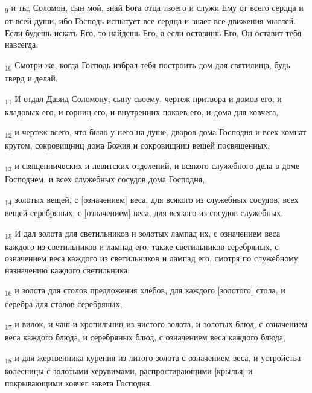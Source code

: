 \begin{tcolorbox}
\textsubscript{9} и ты, Соломон, сын мой, знай Бога отца твоего и служи Ему от всего сердца и от всей души, ибо Господь испытует все сердца и знает все движения мыслей. Если будешь искать Его, то найдешь Его, а если оставишь Его, Он оставит тебя навсегда.
\end{tcolorbox}
\begin{tcolorbox}
\textsubscript{10} Смотри же, когда Господь избрал тебя построить дом для святилища, будь тверд и делай.
\end{tcolorbox}
\begin{tcolorbox}
\textsubscript{11} И отдал Давид Соломону, сыну своему, чертеж притвора и домов его, и кладовых его, и горниц его, и внутренних покоев его, и дома для ковчега,
\end{tcolorbox}
\begin{tcolorbox}
\textsubscript{12} и чертеж всего, что было у него на душе, дворов дома Господня и всех комнат кругом, сокровищниц дома Божия и сокровищниц вещей посвященных,
\end{tcolorbox}
\begin{tcolorbox}
\textsubscript{13} и священнических и левитских отделений, и всякого служебного дела в доме Господнем, и всех служебных сосудов дома Господня,
\end{tcolorbox}
\begin{tcolorbox}
\textsubscript{14} золотых вещей, с [означением] веса, для всякого из служебных сосудов, всех вещей серебряных, с [означением] веса, для всякого из сосудов служебных.
\end{tcolorbox}
\begin{tcolorbox}
\textsubscript{15} И дал золота для светильников и золотых лампад их, с означением веса каждого из светильников и лампад его, также светильников серебряных, с означением веса каждого из светильников и лампад его, смотря по служебному назначению каждого светильника;
\end{tcolorbox}
\begin{tcolorbox}
\textsubscript{16} и золота для столов предложения хлебов, для каждого [золотого] стола, и серебра для столов серебряных,
\end{tcolorbox}
\begin{tcolorbox}
\textsubscript{17} и вилок, и чаш и кропильниц из чистого золота, и золотых блюд, с означением веса каждого блюда, и серебряных блюд, с означением веса каждого блюда,
\end{tcolorbox}
\begin{tcolorbox}
\textsubscript{18} и для жертвенника курения из литого золота с означением веса, и устройства колесницы с золотыми херувимами, распростирающими [крылья] и покрывающими ковчег завета Господня.
\end{tcolorbox}
